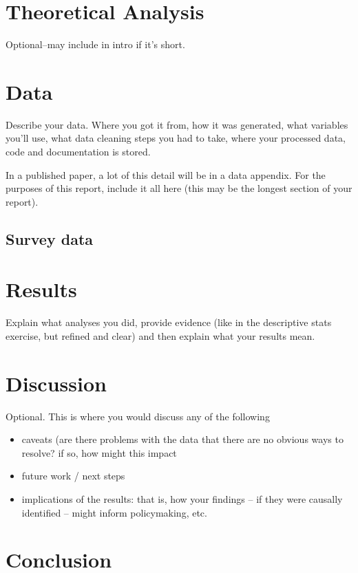 \documentclass[12pt]{article}
\begin{document}
\section{Theoretical Analysis}
\label{sec:theory}
Optional--may include in intro if it's short.


\section{Data}
\label{sec:data}

Describe your data. Where you got it from, how it was generated, what variables you'll use, what data cleaning steps you had to take, where your processed data, code and documentation is stored.

In a published paper, a lot of this detail will be in a data appendix. For the purposes of this report, include it all here (this may be the longest section of your report).

\subsection{Survey data}

\section{Results}
\label{sec:result}

Explain what analyses you did, provide evidence (like in the descriptive stats exercise, but refined and clear) and then explain what your results mean.




\section{Discussion}
\label{sec:discussion}

Optional. This is where you would discuss any of the following
\begin{itemize}
    \item caveats (are there problems with the data that there are no obvious ways to resolve? if so, how might this impact
    \item future work / next steps
    \item implications of the results: that is, how your findings -- if they were causally identified -- might inform policymaking, etc.
\end{itemize}

\section{Conclusion}
\label{sec:conclusion}
\end{document}
